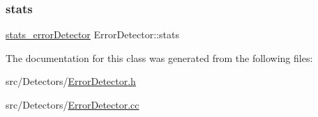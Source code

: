 \subsubsection{\texorpdfstring{stats}{stats}}
{\footnotesize\ttfamily \hyperlink{ErrorDetector_8h_abbc922e22c7b55f0bd58bea618eec587}{stats\+\_\+error\+Detector} Error\+Detector\+::stats\hspace{0.3cm}{\ttfamily [private]}}



The documentation for this class was generated from the following files\+:\begin{DoxyCompactItemize}
\item 
src/\+Detectors/\hyperlink{ErrorDetector_8h}{Error\+Detector.\+h}\item 
src/\+Detectors/\hyperlink{ErrorDetector_8cc}{Error\+Detector.\+cc}\end{DoxyCompactItemize}
